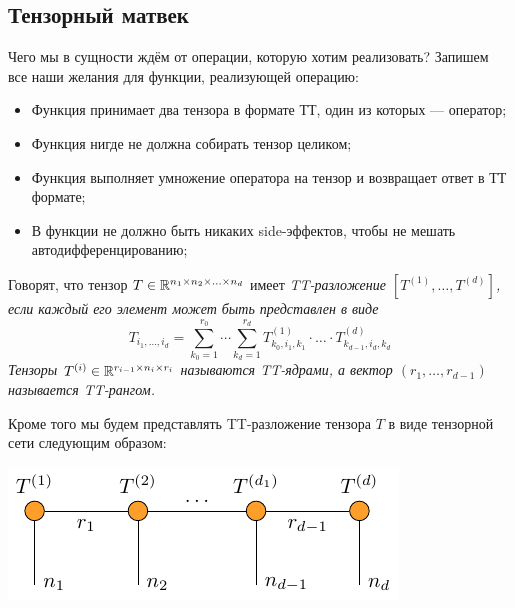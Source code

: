 \documentclass[12pt]{article}
\begin{document}
    \subsection*{Тензорный матвек}
    Чего мы в сущности ждём от операции, которую хотим реализовать? Запишем все наши желания для функции, реализующей операцию:
    \begin{itemize}
        \item Функция принимает два тензора в формате ТТ, один из которых --- оператор;
        \item Функция нигде не должна собирать тензор целиком;
        \item Функция выполняет умножение оператора на тензор и возвращает ответ в ТТ формате;
        \item В функции не должно быть никаких side-эффектов, чтобы не мешать автодифференцированию;
    \end{itemize}
    \begin{definition}
        Говорят, что тензор $T \in \mathbb{R}^{n_1 \times n_2 \times \ldots \times n_d}$ имеет \it{TT-разложение}
        $\left[ T^{(1)}, \ldots, T^{(d)} \right]$, если каждый его элемент может быть представлен в виде
        \[
            T_{i_1, \ldots, i_d} = \sum_{k_0 = 1}^{r_0} \cdots \sum_{k_d = 1}^{r_d} T^{(1)}_{k_0, i_1, k_1} \cdot\ldots\cdot T^{(d)}_{k_{d-1}, i_d, k_d}
        \]
        Тензоры $T^{(i)} \in \mathbb{R}^{r_{i-1} \times n_i \times r_i}$ называются \it{TT-ядрами}, а вектор $(r_1, \ldots, r_{d-1})$ называется \it{TT-рангом}.
    \end{definition}
    Кроме того мы будем представлять TT-разложение тензора $T$ в виде тензорной сети следующим образом:
    \begin{center}
        \includegraphics[scale=1.2]{./pic/tensornet_tensor}
    \end{center}
\end{document}
